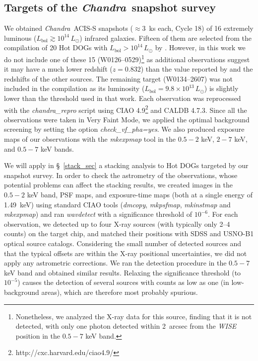 \documentclass[useAMS,usenatbib]{mnras}
\newcommand*{\chandra}{\textit{Chandra}}
\begin{document}
\subsection{Targets of the \chandra\, snapshot survey}\label{snap}
We obtained \chandra\, ACIS-S snapshots (\mbox{$\approx3$ ks} each, Cycle 18) of 16 extremely luminous \mbox{($L_{\mathrm{bol}}\gtrsim10^{14}\, L_\odot$)} infrared galaxies. Fifteen of them are selected from the compilation of 20 Hot DOGs with $L_{\mathrm{bol}}>10^{14}\, L_\odot$ by \cite{Tsai15}. However, in this work we do not include one of these 15 \mbox{(W0126--0529)}\footnote{Nonetheless, we analyzed the X-ray data for this source, finding that it is not detected, with only one photon detected within 2~arcsec from the \textit{WISE} position in the $0.5-7$ keV band.} as additional observations suggest it may have a much lower redshift ($z=0.832$) than the value reported by \citet[$z=2.937$]{Tsai15} and the redshifts of the other sources.
 The remaining target (W0134--2607) was not included in the \cite{Tsai15} compilation as its luminosity \mbox{($L_{\mathrm{bol}}=9.8\times10^{13}\, L_\odot$)} is slightly lower than the threshold used in that work. Each observation was reprocessed with the \textit{chandra\_repro} script using CIAO 4.9\footnote{http://cxc.harvard.edu/ciao4.9/} and CALDB 4.7.3. Since all the observations were taken in Very Faint Mode, we applied the optimal background screening by setting the option \textit{check\_vf\_pha=yes}. We also produced exposure maps of our observations with the \textit{mkexpmap} tool in the $0.5-2$ keV, $2-7$ keV, and $0.5-7$ keV bands.

We will apply in \S~\ref{stack_sec} a stacking analysis to Hot DOGs targeted by our snapshot survey.
In order to check the astrometry of the observations, whose potential problems can affect the stacking results, we created images in the $0.5-2$ keV  band,  PSF maps, and exposure-time maps (both at a single energy of 1.49~keV) using standard CIAO tools (\textit{dmcopy}, \textit{mkpsfmap}, \textit{mkinstmap} and \textit{mkexpmap}) and ran \textit{wavdetect} with a significance threshold of $10^{-6}$. For each observation, we detected up to four \mbox{X-ray} sources (with typically only 2--4 counts) on the target chip, and matched their positions with SDSS and USNO-B1 optical source catalogs. Considering the small number of detected sources and that the typical offsets are within the X-ray positional uncertainties, we did not apply any astrometric corrections. We ran the detection procedure in the $0.5-7$ keV band and obtained similar results. Relaxing the significance threshold (to $10^{-5}$) causes the detection of several sources with counts as low as one (in low-background areas), which are therefore most probably spurious. 
\end{document}
